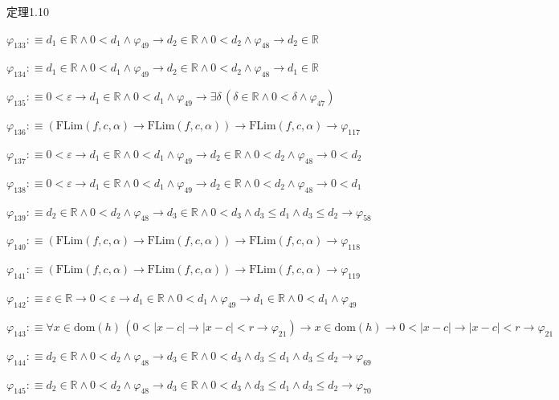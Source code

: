 \begin{fullproof}{定理1.10}
\begin{abbrevlist}
\item $\varphi_{133} :\equiv d_{1} \in \mathbb{R} \land 0 < d_{1} \land \varphi_{49} \to d_{2} \in \mathbb{R} \land 0 < d_{2} \land \varphi_{48} \to d_{2} \in \mathbb{R}$
\item $\varphi_{134} :\equiv d_{1} \in \mathbb{R} \land 0 < d_{1} \land \varphi_{49} \to d_{2} \in \mathbb{R} \land 0 < d_{2} \land \varphi_{48} \to d_{1} \in \mathbb{R}$
\item $\varphi_{135} :\equiv 0 < \varepsilon \to d_{1} \in \mathbb{R} \land 0 < d_{1} \land \varphi_{49} \to \exists \delta\,(\delta \in \mathbb{R} \land 0 < \delta \land \varphi_{47})$
\item $\varphi_{136} :\equiv (\mathrm{FLim}(f,c,\alpha) \to \mathrm{FLim}(f,c,\alpha)) \to \mathrm{FLim}(f,c,\alpha) \to \varphi_{117}$
\item $\varphi_{137} :\equiv 0 < \varepsilon \to d_{1} \in \mathbb{R} \land 0 < d_{1} \land \varphi_{49} \to d_{2} \in \mathbb{R} \land 0 < d_{2} \land \varphi_{48} \to 0 < d_{2}$
\item $\varphi_{138} :\equiv 0 < \varepsilon \to d_{1} \in \mathbb{R} \land 0 < d_{1} \land \varphi_{49} \to d_{2} \in \mathbb{R} \land 0 < d_{2} \land \varphi_{48} \to 0 < d_{1}$
\item $\varphi_{139} :\equiv d_{2} \in \mathbb{R} \land 0 < d_{2} \land \varphi_{48} \to d_{3} \in \mathbb{R} \land 0 < d_{3} \land d_{3} \leq d_{1} \land d_{3} \leq d_{2} \to \varphi_{58}$
\item $\varphi_{140} :\equiv (\mathrm{FLim}(f,c,\alpha) \to \mathrm{FLim}(f,c,\alpha)) \to \mathrm{FLim}(f,c,\alpha) \to \varphi_{118}$
\item $\varphi_{141} :\equiv (\mathrm{FLim}(f,c,\alpha) \to \mathrm{FLim}(f,c,\alpha)) \to \mathrm{FLim}(f,c,\alpha) \to \varphi_{119}$
\item $\varphi_{142} :\equiv \varepsilon \in \mathbb{R} \to 0 < \varepsilon \to d_{1} \in \mathbb{R} \land 0 < d_{1} \land \varphi_{49} \to d_{1} \in \mathbb{R} \land 0 < d_{1} \land \varphi_{49}$
\item $\varphi_{143} :\equiv \forall x \in \mathrm{dom}(h)\,(0 < \lvert x - c \rvert \to \lvert x - c \rvert < r \to \varphi_{21}) \to x \in \mathrm{dom}(h) \to 0 < \lvert x - c \rvert \to \lvert x - c \rvert < r \to \varphi_{21}$
\item $\varphi_{144} :\equiv d_{2} \in \mathbb{R} \land 0 < d_{2} \land \varphi_{48} \to d_{3} \in \mathbb{R} \land 0 < d_{3} \land d_{3} \leq d_{1} \land d_{3} \leq d_{2} \to \varphi_{69}$
\item $\varphi_{145} :\equiv d_{2} \in \mathbb{R} \land 0 < d_{2} \land \varphi_{48} \to d_{3} \in \mathbb{R} \land 0 < d_{3} \land d_{3} \leq d_{1} \land d_{3} \leq d_{2} \to \varphi_{70}$

\end{abbrevlist}
\end{fullproof}
